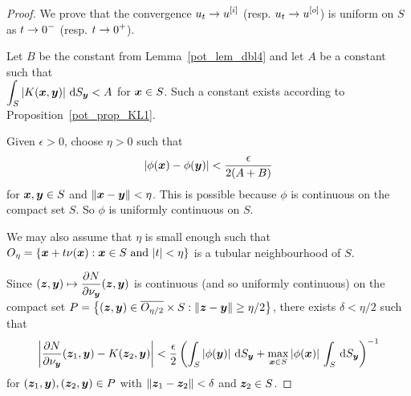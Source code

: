 \begin{proof}
We prove that the convergence $\displaystyle u_t \rightarrow u^{[i]}$ (resp.
$\displaystyle u_t \rightarrow u^{[o]}$) is uniform on $S$ as
$\displaystyle t\rightarrow 0^-$ (resp. $\displaystyle t\rightarrow 0^+$).

Let $B$ be the constant from Lemma~\ref{pot_lem_dbl4} and let $A$
be a constant such that \\
$\displaystyle \int_S \left| K({\bm{x}},{\bm{y}}) \right|
\,\mathrm{d}{S}_{{\bm{y}}} < A$ for ${\bm{x}} \in S$.  Such a constant exists according
to Proposition~\ref{pot_prop_KL1}.

Given $\epsilon >0$, choose $\eta>0$ such that
\begin{equation} \label{pot_dblp_B2}
\left|\phi({\bm{x}}) - \phi({\bm{y}}) \right| < \frac{\epsilon}{2(A + B)}
\end{equation}
for ${\bm{x}}, {\bm{y}} \in S$ and $\|{\bm{x}} - {\bm{y}}\| < \eta$.
This is possible because $\phi$ is continuous on the compact
set $S$.  So $\phi$ is uniformly continuous on
$S$.

We may also assume that $\eta$ is small enough such that \\
$\displaystyle
O_\eta = \left\{ {\bm{x}} + t \nu({\bm{x}}) : {\bm{x}} \in S
\ \text{and} \ |t| < \eta \right\}$
is a tubular neighbourhood of $S$.

Since
$\displaystyle
({\bm{z}},{\bm{y}}) \mapsto \frac{\partial{N}}{\partial \nu_{{\bm{y}}}}({\bm{z}},{\bm{y}})$ is
continuous (and so uniformly continuous) on the compact set
$\displaystyle
P = \left\{ ({\bm{z}},{\bm{y}}) \in \overline{O_{\eta/2}} \times S
: \| {\bm{z}}-{\bm{y}} \| \geq \eta/2 \right\}$,
there exists $\delta < \eta/2$ such that
\begin{equation} \label{pot_dblp_B1}
\left| \frac{\partial{N}}{\partial \nu_{{\bm{y}}}}({\bm{z}}_1,{\bm{y}})
 - K({\bm{z}}_2,{\bm{y}})
\right| < \frac{\epsilon}{2} \left(\int_S
\left| \phi({\bm{y}}) \right| \,\mathrm{d}{S}_{{\bm{y}}} + \max_{{\bm{x}}\in S}
|\phi({\bm{x}})|\, \int_S \,\mathrm{d}{S}_{{\bm{y}}} \right)^{-1}
\end{equation}
for $({\bm{z}}_1,{\bm{y}}) , ({\bm{z}}_2,{\bm{y}}) \in P$ with
$\|{\bm{z}}_1-{\bm{z}}_2\| < \delta$ and ${\bm{z}}_2 \in S$.


\end{proof}
